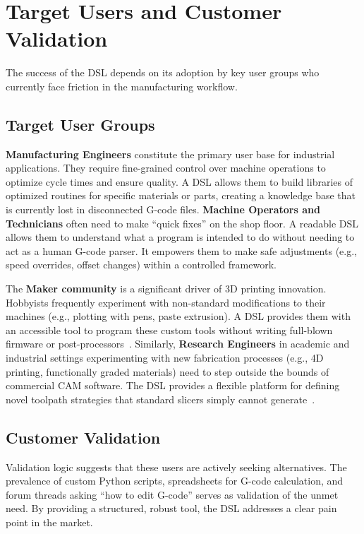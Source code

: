 \section{Target Users and Customer Validation}

The success of the DSL depends on its adoption by key user groups who currently face friction in the manufacturing workflow.

\subsection{Target User Groups}

\textbf{Manufacturing Engineers} constitute the primary user base for industrial applications. They require fine-grained control over machine operations to optimize cycle times and ensure quality. A DSL allows them to build libraries of optimized routines for specific materials or parts, creating a knowledge base that is currently lost in disconnected G-code files. \textbf{Machine Operators and Technicians} often need to make ``quick fixes'' on the shop floor. A readable DSL allows them to understand what a program is intended to do without needing to act as a human G-code parser. It empowers them to make safe adjustments (e.g., speed overrides, offset changes) within a controlled framework.

The \textbf{Maker community} is a significant driver of 3D printing innovation. Hobbyists frequently experiment with non-standard modifications to their machines (e.g., plotting with pens, paste extrusion). A DSL provides them with an accessible tool to program these custom tools without writing full-blown firmware or post-processors~\cite{mavri_survey_2021}. Similarly, \textbf{Research Engineers} in academic and industrial settings experimenting with new fabrication processes (e.g., 4D printing, functionally graded materials) need to step outside the bounds of commercial CAM software. The DSL provides a flexible platform for defining novel toolpath strategies that standard slicers simply cannot generate~\cite{riffel_artificial_2025}.

\subsection{Customer Validation}
Validation logic suggests that these users are actively seeking alternatives. The prevalence of custom Python scripts, spreadsheets for G-code calculation, and forum threads asking ``how to edit G-code'' serves as validation of the unmet need. By providing a structured, robust tool, the DSL addresses a clear pain point in the market.


